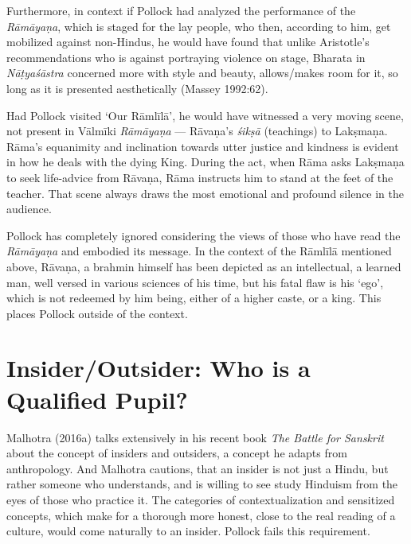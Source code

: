 Furthermore, in context if Pollock had analyzed the performance of the \textit{Rāmāyaṇa}, which is staged for the lay people, who then, according to him, get mobilized against non-Hindus, he would have found that unlike Aristotle’s recommendations who is against portraying violence on stage, Bharata in \textit{Nāṭyaśāstra} concerned more with style and beauty, allows/makes room for it, so long as it is presented aesthetically (Massey 1992:62).

Had Pollock visited ‘Our Rāmlīlā’, he would have witnessed a very moving scene, not present in Vālmīki \textit{Rāmāyaṇa} — Rāvaṇa’s \textit{śikṣā} (teachings) to Lakṣmaṇa. Rāma’s equanimity and inclination towards utter justice and kindness is evident in how he deals with the dying King. During the act, when Rāma asks Lakṣmaṇa to seek life-advice from Rāvaṇa, Rāma instructs him to stand at the feet of the teacher. That scene always draws the most emotional and profound silence in the audience.

Pollock has completely ignored considering the views of those who have read the \textit{Rāmāyaṇa} and embodied its message. In the context of the Rāmlīlā mentioned above, Rāvaṇa, a brahmin himself has been depicted as an intellectual, a learned man, well versed in various sciences of his time, but his fatal flaw is his ‘ego’, which is not redeemed by him being, either of a higher caste, or a king. This places Pollock outside of the context.

\section*{Insider/Outsider: Who is a Qualified Pupil?}

Malhotra (2016a) talks extensively in his recent book \textit{The Battle for Sanskrit} about the concept of insiders and outsiders, a concept he adapts from anthropology. And Malhotra cautions, that an insider is not just a Hindu, but rather someone who understands, and is willing to see study Hinduism from the eyes of those who practice it. The categories of contextualization and sensitized concepts, which make for a thorough more honest, close to the real reading of a culture, would come naturally to an insider. Pollock fails this requirement.

